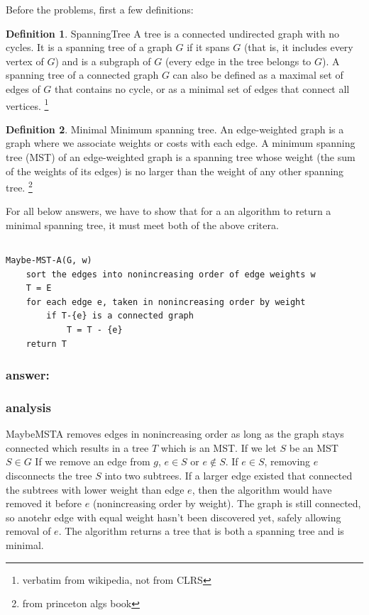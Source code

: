 \documentclass[titlepage]{article}
\theoremstyle{definition}
\newtheorem{definition}{Definition}[section]
\begin{document}
Before the problems, first a few definitions:

\theoremstyle{definition}
\begin{definition}{SpanningTree}
  A tree is a connected undirected graph with no cycles. It is a spanning tree
  of a graph $G$ if it spans $G$ (that is, it includes every vertex of $G$) and is a
  subgraph of $G$ (every edge in the tree belongs to $G$). A spanning tree of a
  connected graph $G$ can also be defined as a maximal set of edges of $G$ that
  contains no cycle, or as a minimal set of edges that connect all vertices.
  \footnote{verbatim from wikipedia, not from CLRS}
\end{definition}
\begin{definition}{Minimal}
  Minimum spanning tree. An edge-weighted graph is a graph where we associate
  weights or costs with each edge. A minimum spanning tree (MST) of an
  edge-weighted graph is a spanning tree whose weight (the sum of the weights
  of its edges) is no larger than the weight of any other spanning tree.
  \footnote{from princeton algs book}
\end{definition}

For all below answers, we have to show that for a an algorithm to return a
minimal spanning tree, it must meet both of the above critera.

\subsection{}
\begin{lstlisting}
Maybe-MST-A(G, w)
	sort the edges into nonincreasing order of edge weights w
	T = E
	for each edge e, taken in nonincreasing order by weight
		if T-{e} is a connected graph
			T = T - {e}
	return T
\end{lstlisting}
\subsubsection{answer: }
    \subsubsection{analysis}
      MaybeMSTA removes edges in nonincreasing order as long as the graph stays
      connected which results in a tree $T$ which is an MST. If we let $S$ be an
      MST $S \in G$  If we remove an edge from $g$, $e \in S$ or $e \notin S$. If
      $e \in S$, removing $e$ disconnects the tree $S$ into two subtrees. If a
      larger edge existed that connected the subtrees with lower weight than edge
      $e$, then the algorithm would have removed it before $e$ (nonincreasing order
      by weight). The graph is still connected, so anotehr edge with equal weight
      hasn't been discovered yet, safely allowing removal of $e$. 
      The algorithm returns a tree that is both a spanning tree and is minimal.
\end{document}

